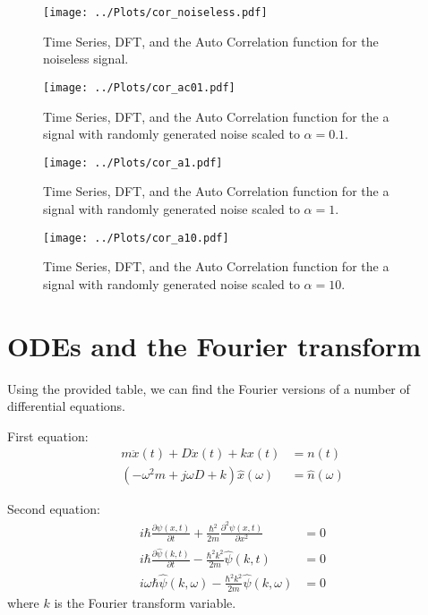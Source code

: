 \documentclass[twocolumn]{myarticle}
\begin{document}
\begin{figure}[ht]
    \centering
    \texttt{[image: ../Plots/cor\_noiseless.pdf]}
    \caption{Time Series, DFT, and the Auto Correlation function for the noiseless signal.}
    \label{fig:noiseless}
\end{figure}

\begin{figure}[ht]
    \centering
    \texttt{[image: ../Plots/cor\_ac01.pdf]}
    \caption{Time Series, DFT, and the Auto Correlation function for the a signal with randomly generated noise scaled to $\alpha = 0.1$.}
    \label{fig:a01}
\end{figure}
\begin{figure}[ht]
    \centering
    \texttt{[image: ../Plots/cor\_a1.pdf]}
    \caption{Time Series, DFT, and the Auto Correlation function for the a signal with randomly generated noise scaled to $\alpha = 1$.}
    \label{fig:a1}
\end{figure}
\begin{figure}[ht]
    \centering
    \texttt{[image: ../Plots/cor\_a10.pdf]}
    \caption{Time Series, DFT, and the Auto Correlation function for the a signal with randomly generated noise scaled to $\alpha = 10$.}
    \label{fig:a10}
\end{figure}



\section{ODEs and the Fourier transform}
\label{sec:odes_and_the_fourier_transform}

Using the provided table, we can find the Fourier versions of a number of differential equations.

First equation:
\begin{align}
    m \ddot{x}(t) + D \dot{x}(t) + k x(t) &= n(t)
    \\
    \left( - \omega^2 m + j \omega D + k \right) \hat{x}(\omega) &= \hat{n}(\omega)
\end{align}

Second equation:
\begin{align}
    i \hbar \frac{\partial \psi(x, t)}{\partial t} + \frac{\hbar^2}{2m} \frac{\partial^2 \psi(x, t)}{\partial x^2} &= 0
    \\
    i \hbar \frac{\partial \hat{\psi}(k,t)}{\partial t} - \frac{\hbar^2 k^2}{2m} \hat{\psi}(k, t) &= 0
    \\
    i \omega \hbar {\hat{\psi}}(k,\omega) - \frac{\hbar^2 k^2}{2m} {\hat{\psi}}(k, \omega) &= 0
\end{align}
where $ k $ is the Fourier transform variable.
\end{document}
